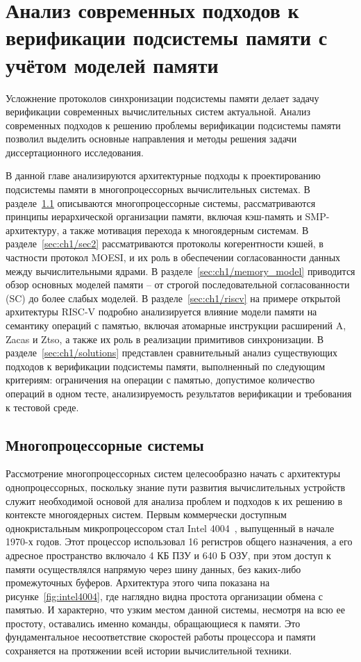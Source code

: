 \chapter{Анализ современных подходов к верификации подсистемы памяти
с учётом моделей памяти}\label{ch:ch1}

Усложнение протоколов синхронизации подсистемы памяти делает задачу
верификации современных вычислительных систем актуальной.
Анализ современных подходов к решению проблемы верификации подсистемы
памяти позволил выделить основные направления и методы решения задачи
диссертационного исследования.

В данной главе анализируются архитектурные подходы к проектированию
подсистемы памяти в многопроцессорных вычислительных системах.
В разделе~\ref{sec:ch1/sec1} описываются многопроцессорные системы,
рассматриваются принципы иерархической организации памяти, включая
кэш-память и SMP-архитектуру, а также мотивация перехода к
многоядерным системам.
В разделе~\ref{sec:ch1/sec2} рассматриваются протоколы когерентности
кэшей, в частности протокол MOESI, и их роль в обеспечении
согласованности данных между вычислительными ядрами.
В разделе~\ref{sec:ch1/memory_model} приводится обзор основных
моделей памяти -- от строгой последовательной согласованности (SC) до
более слабых моделей.
В разделе~\ref{sec:ch1/riscv} на примере открытой архитектуры RISC-V
подробно анализируется влияние модели памяти на семантику операций с
памятью, включая атомарные инструкции расширений A, Zacas и Ztso, а
также их роль в реализации примитивов синхронизации.
В разделе~\ref{sec:ch1/solutions} представлен сравнительный анализ
существующих подходов к верификации подсистемы памяти, выполненный по
следующим критериям: ограничения на операции с памятью,
допустимое количество операций в одном тесте, анализируемость
результатов верификации и требования к тестовой среде.

\section{Многопроцессорные системы}\label{sec:ch1/sec1}

Рассмотрение многопроцессорных систем целесообразно начать с
архитектуры однопроцессорных, поскольку знание пути развития
вычислительных устройств служит необходимой основой для анализа
проблем и подходов к их решению в контексте многоядерных систем.
Первым коммерчески доступным однокристальным микропроцессором стал
Intel 4004~\cite{intel4004}, выпущенный в начале 1970-х годов.
Этот процессор использовал 16 регистров общего назначения, а его
адресное пространство включало 4 КБ ПЗУ и 640 Б ОЗУ, при этом доступ
к памяти осуществлялся напрямую через шину данных, без каких-либо
промежуточных буферов.
Архитектура этого чипа показана на рисунке~\ref{fig:intel4004}, где
наглядно видна простота организации обмена с памятью.
И характерно, что узким местом данной системы, несмотря на всю ее
простоту, оставались именно команды, обращающиеся к памяти.
Это фундаментальное несоответствие скоростей работы процессора и
памяти сохраняется на протяжении всей истории вычислительной техники.

